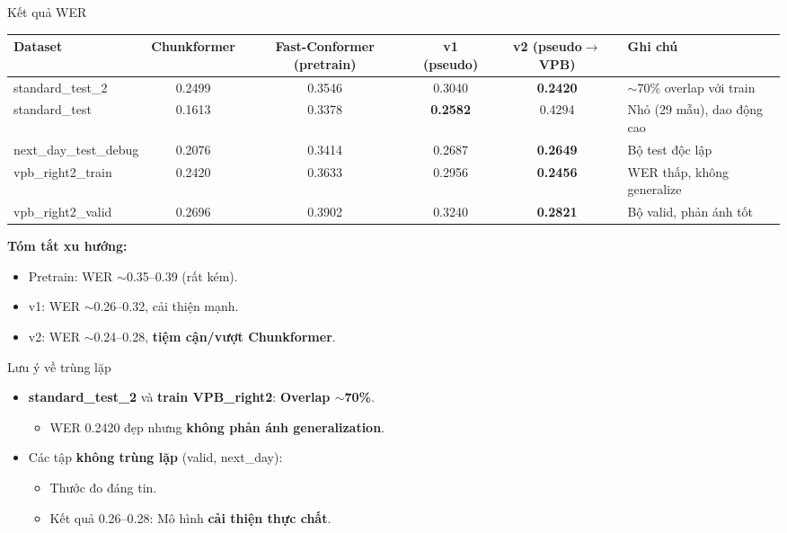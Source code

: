 \documentclass{beamer}
\begin{document}
\begin{frame}{Kết quả WER}
    \begin{table}[ht]
        \centering
        \scriptsize
        \begin{tabular}{l|c|c|c|c|p{3cm}}
            \toprule
            \textbf{Dataset} & \textbf{Chunkformer} & \textbf{Fast-Conformer (pretrain)} & \textbf{v1 (pseudo)} & \textbf{v2 (pseudo$\to$VPB)} & \textbf{Ghi chú} \\
            \midrule
            standard\_test\_2 & 0.2499 & 0.3546 & 0.3040 & \textbf{0.2420} & $\sim$70\% overlap với train \\
            standard\_test & 0.1613 & 0.3378 & \textbf{0.2582} & 0.4294 & Nhỏ (29 mẫu), dao động cao \\
            next\_day\_test\_debug & 0.2076 & 0.3414 & 0.2687 & \textbf{0.2649} & Bộ test độc lập \\
            vpb\_right2\_train & 0.2420 & 0.3633 & 0.2956 & \textbf{0.2456} & WER thấp, không generalize \\
            vpb\_right2\_valid & 0.2696 & 0.3902 & 0.3240 & \textbf{0.2821} & Bộ valid, phản ánh tốt \\
            \bottomrule
        \end{tabular}
    \end{table}
    \vspace{0.2cm}
    \textbf{Tóm tắt xu hướng:}
    \begin{itemize}
        \item Pretrain: WER $\sim$0.35--0.39 (rất kém).
        \item v1: WER $\sim$0.26--0.32, cải thiện mạnh.
        \item v2: WER $\sim$0.24--0.28, \textbf{tiệm cận/vượt Chunkformer}.
    \end{itemize}
\end{frame}

\begin{frame}{Lưu ý về trùng lặp}
    \begin{itemize}
        \item \textbf{standard\_test\_2} và \textbf{train VPB\_right2}: \textbf{Overlap $\sim$70\%}.
            \begin{itemize}
                \item WER 0.2420 đẹp nhưng \textbf{không phản ánh generalization}.
            \end{itemize}
        \item Các tập \textbf{không trùng lặp} (valid, next\_day):
            \begin{itemize}
                \item Thước đo đáng tin.
                \item Kết quả 0.26--0.28: Mô hình \textbf{cải thiện thực chất}.
            \end{itemize}
    \end{itemize}
\end{frame}
\end{document}
